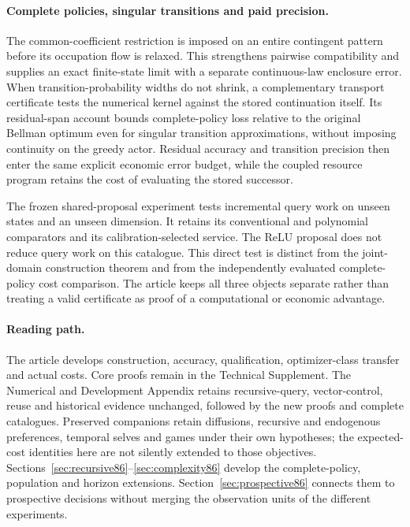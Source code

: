 \documentclass[ecta,nameyear,draft]{econsocart}
\begin{document}
\paragraph{Complete policies, singular transitions and paid precision.}
The common-coefficient restriction is imposed on an entire contingent pattern before its occupation flow is relaxed. This strengthens pairwise compatibility and supplies an exact finite-state limit with a separate continuous-law enclosure error. When transition-probability widths do not shrink, a complementary transport certificate tests the numerical kernel against the stored continuation itself. Its residual-span account bounds complete-policy loss relative to the original Bellman optimum even for singular transition approximations, without imposing continuity on the greedy actor. Residual accuracy and transition precision then enter the same explicit economic error budget, while the coupled resource program retains the cost of evaluating the stored successor.

The frozen shared-proposal experiment tests incremental query work on unseen states and an unseen dimension. It retains its conventional and polynomial comparators and its calibration-selected service. The ReLU proposal does not reduce query work on this catalogue. This direct test is distinct from the joint-domain construction theorem and from the independently evaluated complete-policy cost comparison. The article keeps all three objects separate rather than treating a valid certificate as proof of a computational or economic advantage.

\paragraph{Reading path.}
The article develops construction, accuracy, qualification, optimizer-class transfer and actual costs. Core proofs remain in the Technical Supplement. The Numerical and Development Appendix retains recursive-query, vector-control, reuse and historical evidence unchanged, followed by the new proofs and complete catalogues. Preserved companions retain diffusions, recursive and endogenous preferences, temporal selves and games under their own hypotheses; the expected-cost identities here are not silently extended to those objectives. Sections~\ref{sec:recursive86}--\ref{sec:complexity86} develop the complete-policy, population and horizon extensions. Section~\ref{sec:prospective86} connects them to prospective decisions without merging the observation units of the different experiments.
\end{document}
